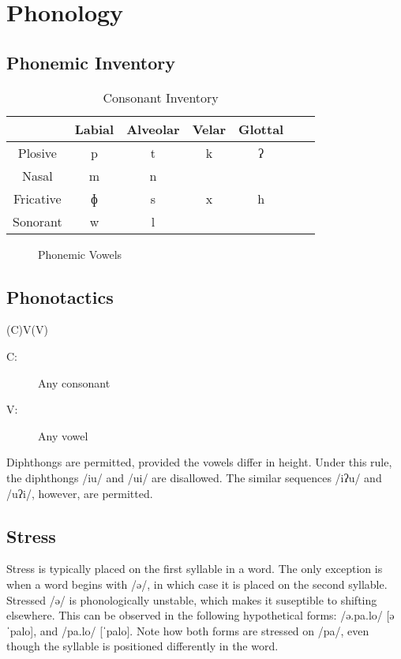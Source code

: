 \chapter{Phonology}

\section{Phonemic Inventory}
\begin{table}[ht]
  \centering
  \begin{tabular}{*{7}{c}}
    \toprule
              & Labial & Alveolar & Velar & Glottal \\\midrule
    Plosive   & p      & t        & k     & ʔ       \\
    Nasal     & m      & n        &       &         \\
    Fricative & ɸ      & s        & x     & h       \\
    Sonorant  & w      & l        &       &         \\
    \bottomrule
  \end{tabular}
  \caption{Consonant Inventory}
  \label{table:consonants}
\end{table}


\begin{figure}[ht]
  \centering
  \begin{vowel}
  \end{vowel}
  \caption{Phonemic Vowels}
  \label{table:vowels}
\end{figure}

\section{Phonotactics}\label{sec:phonotactics}

(C)V(V)
\begin{description}
  \item[C:] Any consonant
  \item[V:] Any vowel
\end{description}

Diphthongs are permitted, provided the vowels differ in height. Under this rule, the diphthongs /iu/ and /ui/ are disallowed. The similar sequences /iʔu/ and /uʔi/, however, are permitted.

\section{Stress}
Stress is typically placed on the first syllable in a word. The only exception is when a word begins with /ə/, in which case it is placed on the second syllable. Stressed /ə/ is phonologically unstable, which makes it suseptible to shifting elsewhere. This can be observed in the following hypothetical forms: /ə.pa.lo/ [əˈpalo], and /pa.lo/ [ˈpalo]. Note how both forms are stressed on /pa/, even though the syllable is positioned differently in the word.

